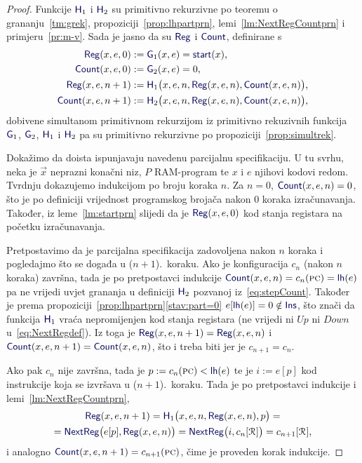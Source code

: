\begin{proof}
Funkcije $\f H_1$ i $\f H_2$ su primitivno rekurzivne po teoremu o grananju~\ref{tm:grek}, propoziciji~\ref{prop:lhpartprn}, lemi~\ref{lm:NextRegCountprn} i primjeru~\ref{pr:m-v}. Sada je jasno da su $\f{Reg}$ i $\f{Count}$, definirane s
\begin{align}
    \f{Reg}(x,e,0)&:=\f G_1(x,e)=\f{start}(x)\text,\\
    \f{Count}(x,e,0)&:=\f G_2(x,e)=0\text,\\
    \label{eq:stepReg}\f{Reg}(x,e,n+1)&:=\f H_1\bigl(x,e,n,\f{Reg}(x,e,n),\f{Count}(x,e,n)\bigr)\text,\\
    \label{eq:stepCount}\f{Count}(x,e,n+1)&:=\f H_2\bigl(x,e,n,\f{Reg}(x,e,n),\f{Count}(x,e,n)\bigr)\text,
\end{align}
dobivene simultanom primitivnom rekurzijom iz primitivno rekuzivnih funkcija $\f G_1$, $\f G_2$, $\f H_1$ i $\f H_2$ pa su primitivno rekurzivne po propoziciji~\ref{prop:simultrek}.

    Dokažimo da doista ispunjavaju navedenu parcijalnu specifikaciju. U tu svrhu, neka je $\vec x$ neprazni konačni niz, $P$ RAM-program te $x$ i $e$ njihovi kodovi redom. Tvrdnju dokazujemo indukcijom po broju koraka $n$. Za $n=0$, $\f{Count}(x,e,n)=0$, što je po definiciji vrijednost programskog brojača nakon $0$ koraka izračunavanja. Također, iz leme~\ref{lm:startprn} slijedi da je $\f{Reg}(x,e,0)$ kod stanja registara na početku izračunavanja.

	Pretpostavimo da je parcijalna specifikacija zadovoljena nakon $n$ koraka i pogledajmo što se događa u ($n+1$).\ koraku. Ako je konfiguracija $c_n$ (nakon $n$ koraka) završna, tada je po pretpostavci indukcije $\f{Count}(x,e,n)=c_n(\textsc{pc})=\f{lh}(e)$ pa ne vrijedi uvjet grananja u definiciji $\f H_2$ pozvanoj  iz~\eqref{eq:stepCount}. Također je prema propoziciji~\ref{prop:lhpartprn}\eqref{stav:part=0} $e[\f{lh}(e)]=0\notin\f{Ins}$, što znači da funkcija $\f H_1$ vraća nepromijenjen kod stanja registara (ne vrijedi ni $Up$ ni $Down$ u~\eqref{eq:NextRegdef}). Iz toga je $\f{Reg}(x,e,n+1)=\f{Reg}(x,e,n)$ i $\f{Count}(x,e,n+1)=\f{Count}(x,e,n)$, što i treba biti jer je $c_{n+1}=c_n$.

Ako pak $c_n$ nije završna, tada je $p:=c_n(\textsc{pc})<\f{lh}(e)$ te je $i:=e[p]$ kod instrukcije koja se izvršava u ($n+1$).\ koraku. Tada je po pretpostavci indukcije i lemi~\ref{lm:NextRegCountprn},
\begin{multline}
    \f{Reg}(x,e,n+1)=\f H_1\bigl(x,e,n,\f{Reg}(x,e,n),p\bigr)=\\
	=\f{NextReg}\bigl(e[p],\f{Reg}(x,e,n)\bigr)=\f{NextReg}\bigl(i,c_n[\reg{}]\bigr)=c_{n+1}[\reg{}]\text,
\end{multline}
i analogno $\f{Count}(x,e,n+1)=c_{n+1}(\textsc{pc})$, čime je proveden korak indukcije.
\end{proof}

